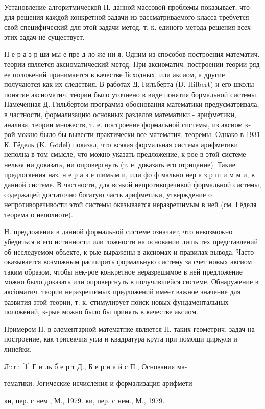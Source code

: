 \documentclass[10pt]{article}
\begin{document}
Установление алгоритмической Н. данной массовой проблемы показывает, что для решения каждой конкретной задачи из рассматриваемого класса требуется свой специфический для этой задачи метод, т. к. единого метода решения всех этих задач не существует.



Н е р а з р ши мы е пре д ло же ни я. Одним из способов построения математич. теории является аксиоматический метод. При аксиоматич. построении теории ряд ее положений принимается в качестве Іісходных, или аксиом, а другие получаются как их следствия. В работах Д. Гильберта (D. Hilbert) и его школы понятие аксиоматич. теории было уточнено в виде понятия бормальной системы. Намеченная Д. Гильбертом программа обоснования математики предусматривала, в частности, формализацию основных разделов математики - арифметики, анализа, теории множеств, т. е. построение формальной системы, из аксиом к-рой можно было бы вывести практически все математич. теоремы. Однако в 1931 К. Гёдель (K. Gödel) показал, что всякая формальная система арифметики неполна в том смысле, что можно указать предложение, к-рое в этой системе нельзя ни доказать, ни опровергнуть (т. е. доказать его отрицание). Такие предлогкения наз. н е р а з е шимым и, или фо ф мально нер а з р ш и м м и, в данной системе. В частности, для всякой непротиворечивой формальной системы, содержацей достаточно богатую часть арифметики, утверждение о непротиворечивости этой системы оказывается неразрешимым в ней (см. Гёделя теорема о неполноте).



Н. предложения в данной формальной системе означает, что невозможно убедиться в его истинности или ложности на основании лишь тех представлений об исследуемом объекте, к-рые выражены в аксиомах и правилах вывода. Часто оказывается возможным расширить формальную систему за счет новых аксиом таким образом, чтобы нек-рое конкретное неразрешимое в ней предложение можно было доказать или опровергнуть в получившейся системе. Обнаружение в аксіоматич. теории неразрешимых предложений имеет важное значение для развития этой теории, т. к. стимулирует поиск новых фундаментальных положений, к-рые можно было бы принять в качестве аксиом.



Примером Н. в әлементарной математпке является Н. таких геометрич. задач на построение, как трисекчия угла и квадратура круга при помощи циркуля и линейки.



Лuт.: [1] Г и ль б е р т Д., Б е р н а й с П., Основания ма-



тематики. Јогические исчисления и формализация арифмети-

ки, пер. с нем., М., 1979. ки, пер. с нем., М., 1979.
\end{document}
